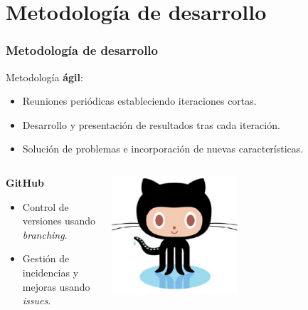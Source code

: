 \documentclass{beamer}
\begin{document}

\section{Metodología de desarrollo}
\begin{frame}[allowframebreaks]
  \frametitle{Metodología de desarrollo}
  
  Metodología {\bfseries ágil}:
  \bigskip
  
  \begin{itemize}
    \item Reuniones periódicas estableciendo iteraciones cortas.
    \item Desarrollo y presentación de resultados tras cada iteración.
    \item Solución de problemas e incorporación de nuevas características. 
  \end{itemize}
  \framebreak
    
  
  \begin{columns}
    \begin{column}{5cm}
    	{\bfseries GitHub}
    	\bigskip
      \begin{itemize}
        \item Control de versiones usando \textit{branching}.
        \item Gestión de incidencias y mejoras usando \textit{issues}.
      \end{itemize}
    \end{column}
    \begin{column}{5cm}
    	\includegraphics[width=0.5\textwidth]{images/octocat.eps}
    \end{column}
  \end{columns}
  \bigskip
  \bigskip  
  

\end{frame}
\end{document}
